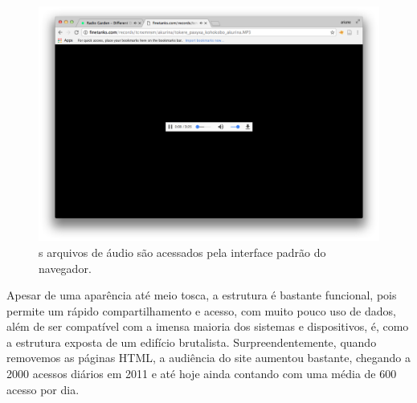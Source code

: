 \begin{figure}
\centering
\includegraphics[width=1\textwidth]{pictures/cap1/finetanksmp3}
\caption{s arquivos de áudio são acessados pela interface padrão do navegador.}
\label{fig:finetanksmp3}
\end{figure}

Apesar de uma aparência até meio tosca, a estrutura é bastante funcional, pois permite um rápido compartilhamento e acesso, com muito pouco uso de dados, além de ser compatível com a imensa maioria dos sistemas e dispositivos, é, como a estrutura exposta de um edifício brutalista. Surpreendentemente, quando removemos as páginas HTML, a audiência do site aumentou bastante, chegando a 2000 acessos diários em 2011 e até hoje ainda contando com uma média de 600 acesso por dia.

